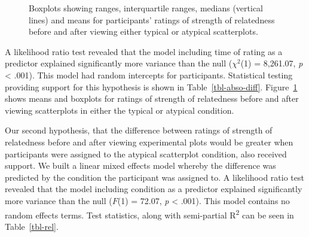\documentclass[manuscript,screen,review]{acmart}
\begin{document}
\begin{figure}


\caption{\label{fig-abso-descriptives}Boxplots showing ranges,
interquartile ranges, medians (vertical lines) and means for
participants' ratings of strength of relatedness before and after
viewing either typical or atypical scatterplots.}

\end{figure}%

A likelihood ratio test revealed that the model including time of rating
as a predictor explained significantly more variance than the null
(\(\chi^2\)(1) = 8,261.07, \emph{p} \textless{} .001). This model had
random intercepts for participants. Statistical testing providing
support for this hypothesis is shown in Table~\ref{tbl-abso-diff}.
Figure~\ref{fig-abso-descriptives} shows means and boxplots for ratings
of strength of relatedness before and after viewing scatterplots in
either the typical or atypical condition.

Our second hypothesis, that the difference between ratings of strength
of relatedness before and after viewing experimental plots would be
greater when participants were assigned to the atypical scatterplot
condition, also received support. We built a linear mixed effects model
whereby the difference was predicted by the condition the participant
was assigned to. A likelihood ratio test revealed that the model
including condition as a predictor explained significantly more variance
than the null (\(F\)(1) = 72.07, \emph{p} \textless{} .001). This model
contains no random effects terms. Test statistics, along with
semi-partial R\textsuperscript{2} can be seen in Table~\ref{tbl-rel}.
\end{document}

